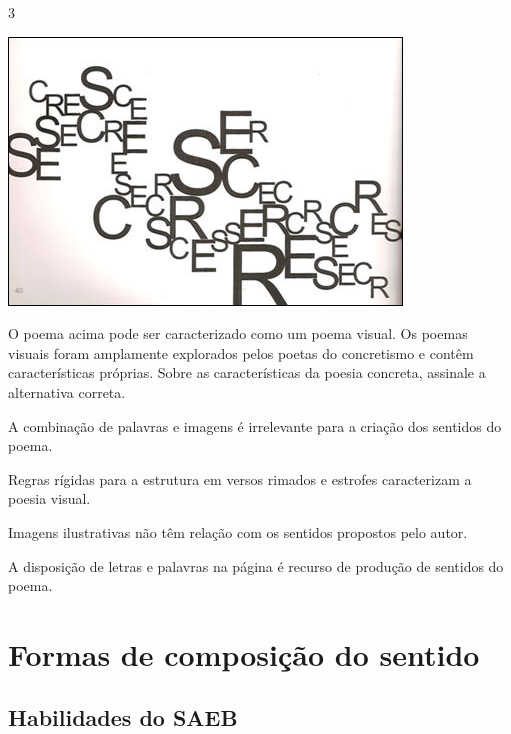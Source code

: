 \num{3}

\includegraphics[width=4.11458in,height=2.80208in]{./imgSAEB_7_POR/media/image3.png}


O poema acima pode ser caracterizado como um poema visual. Os poemas
visuais foram amplamente explorados pelos poetas do concretismo e contêm características próprias. Sobre as características da poesia
concreta, assinale a alternativa correta.

\begin{escolha}

  \item A combinação de palavras e imagens é irrelevante para a criação dos sentidos do poema. 

  \item Regras rígidas para a estrutura em versos rimados e estrofes 
  caracterizam a poesia visual.

  \item Imagens ilustrativas não têm relação com os sentidos propostos 
  pelo autor.

  \item A disposição de letras e palavras na página é recurso de produção de sentidos do poema.

\end{escolha}


\chapter{Formas de composição do sentido}

\section{Habilidades do SAEB}

